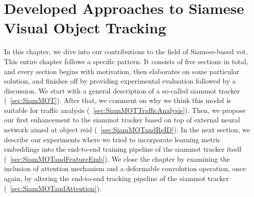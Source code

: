 \chapter{Developed Approaches to Siamese Visual Object Tracking}
\label{chap:DevelopedSiameseTrackingApproaches}

In this chapter, we dive into our contributions to the field of Siamese-based \gls{vot}. This entire chapter follows a specific pattern. It consists of five sections in total, and every section begins with motivation, then elaborates on some particular solution, and finishes off by providing experimental evaluation followed by a discussion. We start with a general description of a so-called \gls{siammot} tracker (\sectiontext{}~\ref{sec:SiamMOT}). After that, we comment on why we think this model is suitable for traffic analysis (\sectiontext{}~\ref{sec:SiamMOTTrafficAnalysis}). Then, we propose our first enhancement to the \gls{siammot} tracker based on top of external neural network aimed at object \gls{reid} (\sectiontext{}~\ref{sec:SiamMOTandReID}). In the next section, we describe our experiments where we tried to incorporate learning metric embeddings into the end-to-end training pipeline of the \gls{siammot} tracker itself (\sectiontext{}~\ref{sec:SiamMOTandFeatureEmb}). We close the chapter by examining the inclusion of attention mechanism and a deformable convolution operation, once again, by altering the end-to-end tracking pipeline of the \gls{siammot} tracker (\sectiontext{}~\ref{sec:SiamMOTandAttention}).






